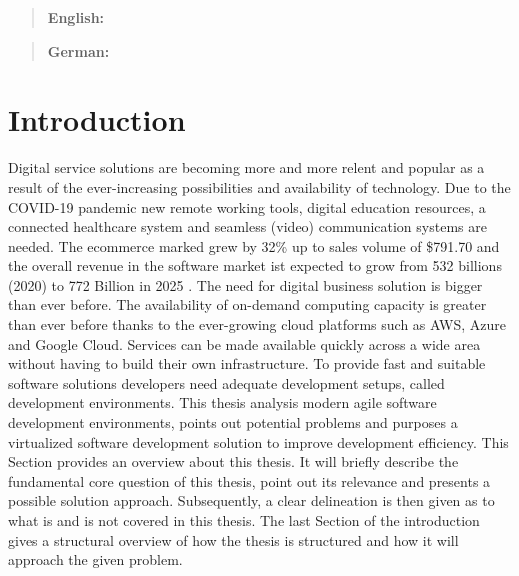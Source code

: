 \documentclass[12pt, a4paper]{article}
\begin{document}



\maketitle
\begin{abstract}
    \textbf{English:} \lipsum[20]
\end{abstract}
\begin{abstract}
    \textbf{German:} \lipsum[20]
\end{abstract}
\newpage

\tableofcontents
\newpage

\setcounter{lastroman}{\value{page}}


\section{Introduction}\label{sec::intro}
Digital service solutions are becoming more and more relent and popular as a result of the ever-increasing possibilities and availability of technology. Due to the COVID-19 pandemic new remote working tools, digital education resources, a connected healthcare system and seamless (video) communication systems are needed. The ecommerce marked grew by 32\% up to sales volume of \$791.70 \cite{online_shopping_inc} and the overall revenue in the software market ist expected to grow from 532 billions (2020) to 772 Billion in 2025 \cite{software_industry_groth}. The need for digital business solution is bigger than ever before. The availability of on-demand computing capacity is greater than ever before thanks to the ever-growing cloud platforms such as \ac{AWS}, Azure and Google Cloud. Services can be made available quickly across a wide area without having to build their own infrastructure. To provide fast and suitable software solutions developers need adequate development setups, called development environments. This thesis analysis modern agile software development environments, points out potential problems and purposes a virtualized software development solution to improve development efficiency.\newline
This Section provides an overview about this thesis. It will briefly describe the fundamental core question of this thesis, point out its relevance and presents a possible solution approach. Subsequently, a clear delineation is then given as to what is and is not covered in this thesis. The last Section of the introduction gives a structural overview of how the thesis is structured and how it will approach the given problem.
\end{document}
